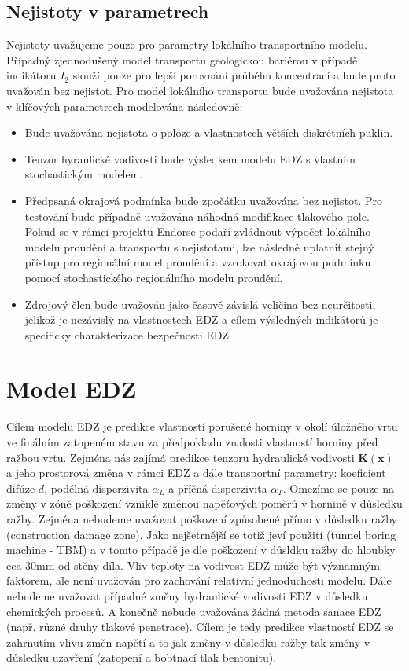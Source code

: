\documentclass{article}
\def\vc#1{\mathbf{\boldsymbol{#1}}}     %
\def\tn#1{\boldsymbol{#1}}
\begin{document}
\subsection{Nejistoty v parametrech}
Nejistoty uvažujeme pouze pro parametry lokálního transportního modelu. Případný zjednodušený model transportu geologickou bariérou v případě indikátoru $I_2$ slouží pouze pro lepší porovnání průběhu koncentrací a bude proto uvažován bez nejistot. Pro model lokálního transportu  bude uvažována nejistota v klíčových parametrech modelována následovně:
\begin{itemize}
 \item Bude uvažována nejistota o poloze a vlastnostech větších diskrétních puklin.
 \item Tenzor hyraulické vodivosti bude výsledkem modelu EDZ s vlastním stochastickým modelem.
 \item Předpsaná okrajová podmínka bude zpočátku uvažována bez nejistot. Pro testování  bude případně uvažována náhodná modifikace tlakového pole. Pokud se v rámci projektu Endorse podaří zvládnout výpočet lokálního modelu proudění a transportu s nejistotami, lze následně uplatnit stejný přístup pro regionální model proudění a vzrokovat okrajovou podmínku pomocí stochastického regionálního modelu proudění.
 \item Zdrojový člen bude uvažován jako časově závislá veličina bez neurčitosti, jelikož 
 je nezávislý na vlastnostech EDZ a cílem výsledných indikátorů je specificky charakterizace bezpečnosti EDZ.
\end{itemize}


\section{Model EDZ}

\label{sec:model_EDZ}
Cílem modelu EDZ je predikce vlastností porušené horniny v okolí úložného vrtu ve finálním 
zatopeném stavu za předpokladu znalosti vlastností horniny před ražbou vrtu. 
Zejména nás zajímá predikce tenzoru hydraulické vodivosti $\tn K(\vc x)$ 
a jeho prostorová změna v rámci EDZ a dále transportní parametry: 
koeficient difúze $d$, podélná disperzivita $\alpha_L$ a příčná disperzivita $\alpha_T$. 
Omezíme se pouze na změny v zóně poškození vzniklé změnou napěťových poměrů v hornině 
v důsledku ražby. Zejména nebudeme uvažovat poškození způsobené přímo v důsledku ražby 
(construction damage zone).
Jako nejšetrnější se totiž jeví použití (tunnel boring machine - TBM) 
a v tomto případě je dle \cite{SURAO_50/2016} poškození v důsldku ražby 
do hloubky cca 30mm od stěny díla. 
Vliv teploty na vodivost EDZ může být významným faktorem, ale není uvažován pro zachování 
relativní jednoduchosti modelu. Dále nebudeme uvažovat případné změny hydraulické vodivosti 
EDZ v důsledku chemických procesů. A konečně nebude uvažována žádná metoda sanace EDZ 
(např. různé druhy tlakové penetrace). Cílem je tedy predikce vlastností EDZ se 
zahrnutím vlivu změn napětí a to jak změny v důsledku ražby tak změny v důsledku uzavření 
(zatopení a bobtnací tlak bentonitu).
\end{document}
